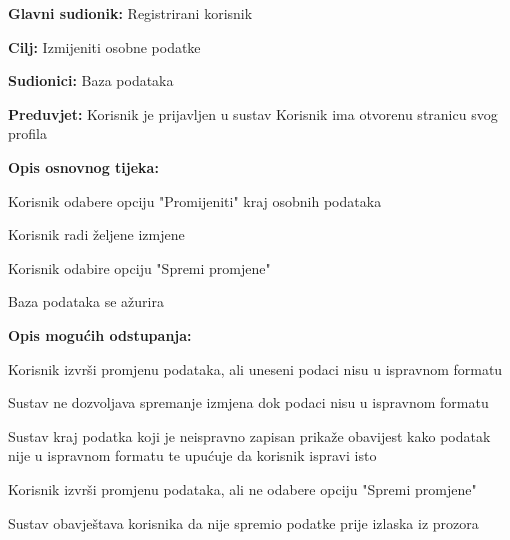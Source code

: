 					\begin{packed_item}
						
						\item \textbf{Glavni sudionik: } Registrirani korisnik
						\item  \textbf{Cilj:} Izmijeniti osobne podatke
						\item  \textbf{Sudionici:} Baza podataka
						\item  \textbf{Preduvjet:} Korisnik je prijavljen u sustav
						Korisnik ima otvorenu stranicu svog profila
						\item  \textbf{Opis osnovnog tijeka:}
						
						\item[] \begin{packed_enum}
							
							\item Korisnik odabere opciju "Promijeniti" kraj osobnih podataka
							\item Korisnik radi željene izmjene
							\item Korisnik odabire opciju "Spremi promjene"
							\item Baza podataka se ažurira
							
						\end{packed_enum}
						
						\item  \textbf{Opis mogućih odstupanja:}
						
						\item[] \begin{packed_item}
							
							\item[3.a]  Korisnik izvrši promjenu podataka, ali uneseni podaci nisu u ispravnom formatu
							\item[] \begin{packed_enum}
								
								\item Sustav ne dozvoljava spremanje izmjena dok podaci nisu u ispravnom formatu
								\item Sustav kraj podatka koji je neispravno zapisan prikaže obavijest kako podatak nije u ispravnom formatu te upućuje da korisnik ispravi isto
								
							\end{packed_enum}
							
							\item[3.b]  Korisnik izvrši promjenu podataka, ali ne odabere opciju "Spremi promjene"
							\item[] \begin{packed_enum}
								
								\item Sustav obavještava korisnika da nije spremio podatke prije izlaska iz prozora
								
							\end{packed_enum}
							
						\end{packed_item}
						
					\end{packed_item}

